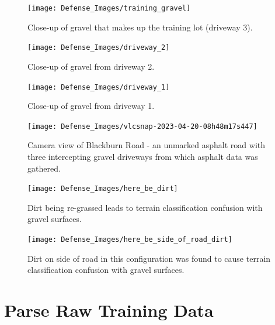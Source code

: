 \documentclass[numbered,pdftex]{ohio-etd}
\begin{document}
{{		\begin{figure}[H]
			\centering
			\texttt{[image: Defense\_Images/training\_gravel]}
			\caption[Training Gravel]{Close-up of gravel that makes up the training lot (driveway 3).}
			\label{fig:training_gravel}
		\end{figure}
		
		\begin{figure}[H]
			\centering
			\texttt{[image: Defense\_Images/driveway\_2]}
			\caption[Driveway 2 Gravel]{Close-up of gravel from driveway 2.}
			\label{fig:driveway_2}
		\end{figure}
		
		\begin{figure}[H]
			\centering
			\texttt{[image: Defense\_Images/driveway\_1]}
			\caption[Driveway 2 Gravel]{Close-up of gravel from driveway 1.}
			\label{fig:driveway_1}
		\end{figure}
		
		\begin{figure}[H]
			\centering
			\texttt{[image: Defense\_Images/vlcsnap-2023-04-20-08h48m17s447]}
			\caption[Blackburn Road Camera View]{Camera view of Blackburn Road - an unmarked asphalt road with three intercepting gravel driveways from which asphalt data was gathered.}
			\label{fig:Blackburn_Road_View_in_results}
		\end{figure}
			
		\begin{figure}[H]
			\centering
			\texttt{[image: Defense\_Images/here\_be\_dirt]}
			\caption[Re-grassed Dirt]{Dirt being re-grassed leads to terrain classification confusion with gravel surfaces.}
			\label{fig:here_be_dirt}
		\end{figure}
				
		\begin{figure}[H]
			\centering
			\texttt{[image: Defense\_Images/here\_be\_side\_of\_road\_dirt]}
			\caption[Dirt on Side of Road]{Dirt on side of road in this configuration was found to cause terrain classification confusion with gravel surfaces.}
			\label{fig:here_be_side_of_road_dirt}
		\end{figure}

		

		
	} %
	
	\section{Parse Raw Training Data}\label{sec:parse_raw_training_data}{
		
}}
\end{document}
